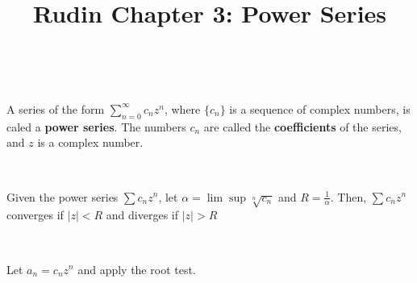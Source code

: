 \documentclass{article}
\title{Rudin Chapter 3: Power Series}
\begin{document}
\maketitle

\begin{definition}
\

A series of the form $\sum_{n=0}^\infty c_nz^n$, where $\{c_n\}$ is a sequence of complex numbers, is caled a \textbf{power series}. The numbers $c_n$ are called the \textbf{coefficients} of the series, and $z$ is a complex number.   
\end{definition}

\begin{theorem}
\

Given the power series $\sum c_nz^n$, let $\alpha = \lim \sup \sqrt[n]{c_n}$ and $R = \frac{1}{\alpha}$. Then, $\sum c_nz^n$ converges if $\vert z \vert < R$ and diverges if $\vert z \vert > R$
\end{theorem}

\begin{customproof}
\

Let $a_n = c_nz^n$ and apply the root test.
\end{customproof}
\end{document}
